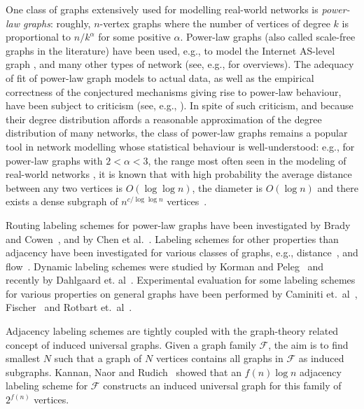One class of graphs extensively used for modelling real-world networks is \emph{power-law graphs}: roughly, $n$-vertex graphs where the number of vertices of degree $k$ is proportional to $n/k^{\alpha}$ for some positive $\alpha$. Power-law graphs (also called scale-free graphs in the literature) have been used, e.g., to model the Internet AS-level graph \cite{DBLP:journals/ton/SiganosFFF03,DBLP:conf/podc/AkellaCKS03}, and many other types of network (see, e.g., \cite{mitzenmacher2004brief,clauset2009power} for overviews). 
The adequacy of fit of power-law graph models to actual data, as well as the empirical correctness of the conjectured mechanisms giving rise to power-law behaviour, have been subject to criticism (see, e.g., \cite{DBLP:journals/jacm/AchlioptasCKM09,clauset2009power}). 
In spite of such criticism, and because their degree distribution affords a reasonable approximation of the degree distribution of many networks, the class of power-law graphs remains a popular tool in network modelling whose statistical behaviour is well-understood: e.g., for power-law graphs with $2<\alpha<3$, the range most often seen in the modeling of real-world networks \cite{clauset2009power}, it is known that with high probability the average distance between any two vertices is  $O(\log \log n)$, the diameter is $O(\log n)$ and there exists a dense subgraph of $n^{c/\log \log n}$ vertices~\cite{chung2004average}. 

Routing labeling schemes for power-law graphs  have been investigated by Brady and Cowen~\cite{brady2006compact}, and by Chen et al.~\cite{chen2012compact}. Labeling schemes for other properties than adjacency have been investigated for various classes of graphs, e.g., distance~\cite{gavoillea2004distance}, and flow~\cite{katz2004labeling}. 
Dynamic labeling schemes were studied by Korman and Peleg~\cite{korman2007compact,Korman07,korman2007general} and recently by Dahlgaard et. al~\cite{dahlgaard2014dynamic}.
Experimental evaluation for some labeling schemes for various properties on general graphs have been performed by Caminiti et.~al~\cite{caminiti2008engineering}, Fischer~\cite{fischer2009short} and Rotbart et.~al~\cite{rotbart2014evaluation}.

Adjacency labeling schemes are tightly coupled with  the graph-theory related concept of induced universal graphs.
Given a  graph family  $\mathcal{F}$, the aim  is to find smallest $N$ such that a graph of  $N$ vertices contains all graphs in $\mathcal{F}$ as induced subgraphs. 
Kannan, Naor and Rudich~\cite{Kannan92} showed that an $f(n) \log n$ adjacency labeling scheme for $\mathcal{F}$  constructs an induced universal graph for this family of  $2^{f(n)}$ vertices. 

